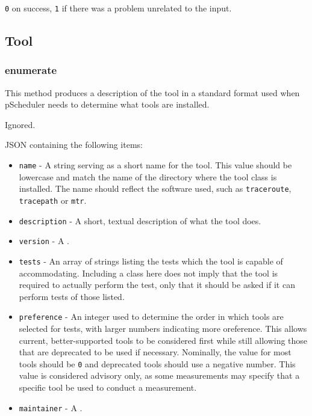 \documentclass[10pt,titlepage]{article}
\begin{document}
 {\tt 0} on success, {\tt 1} if there was a
problem unrelated to the input.



%
%
\subsection{Tool}

\subsubsection{enumerate}

This method produces a description of the tool in a standard format
used when pScheduler needs to determine what tools are installed.

 Ignored.

 JSON containing the following items:
\begin{itemize}
\item{\tt name} - A string serving as a short name for the tool.  This
  value should be lowercase and match the name of the directory where
  the tool class is installed.  The name should reflect the software
  used, such as {\tt traceroute}, {\tt tracepath} or {\tt mtr}.
\item{\tt description} - A short, textual description of what the tool
  does.
\item{\tt version} - A .
\item{\tt tests} - An array of strings listing the tests which the
  tool is capable of accommodating.  Including a class here does not
  imply that the tool is required to actually perform the test, only
  that it should be asked if it can perform tests of those listed.
\item{\tt preference} - An integer used to determine the order in
  which tools are selected for tests, with larger numbers indicating
  more oreference.  This allows current, better-supported tools to be
  considered first while still allowing those that are deprecated to
  be used if necessary.  Nominally, the value for most tools should be
  {\tt 0} and deprecated tools should use a negative number.  This
  value is considered advisory only, as some measurements may specify
  that a specific tool be used to conduct a measurement.
\item{\tt maintainer} - A .
\end{itemize}
\end{document}
